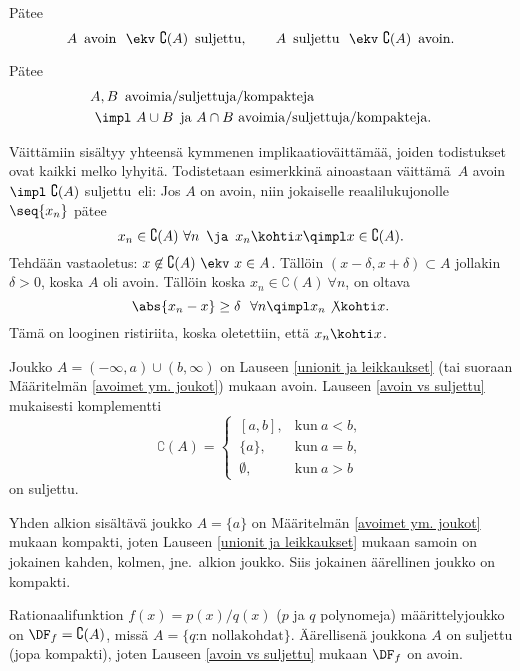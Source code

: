\begin{Lause} \label{avoin vs suljettu} Pätee
\[ 
A\,\text{ avoin }\ \ekv\ \complement(A)\,\text{ suljettu}, \qquad 
A\,\text{ suljettu }\ \ekv\ \complement(A)\,\text{ avoin}. 
\]
\end{Lause}
\begin{Lause} \label{unionit ja leikkaukset} Pätee
\begin{align*}
&A,B\,\text{ avoimia/suljettuja/kompakteja } \\
& \ \impl\ A\cup B\,\text{ ja } A\cap B\text{ avoimia/suljettuja/kompakteja}.
\end{align*}
\end{Lause}
\tod Väittämiin sisältyy yhteensä kymmenen implikaatioväittämää, joiden todistukset ovat
kaikki melko lyhyitä. Todistetaan esimerkkinä ainoastaan väittämä
$\,A$ avoin $\impl\ \complement (A)$ suljettu\, eli: Jos $A$ on avoin, niin jokaiselle
reaalilukujonolle $\seq{x_n}$ pätee
\[ 
x_n \in \complement(A)\ \forall n\,\ \ja\,\ x_n \kohti x \qimpl x \in \complement (A). 
\]
Tehdään vastaoletus: $x\not\in\complement (A)\ \ekv\ x \in A$. Tällöin 
$(x-\delta,x+\delta) \subset A$ jollakin $\delta>0$, koska $A$ oli avoin. Tällöin koska
$x_n\in\complement(A)\ \forall n$, on oltava
\[ 
\abs{x_n-x} \ge \delta\ \ \forall n \qimpl x_n \not\kohti x.
\]
Tämä on looginen ristiriita, koska oletettiin, että $x_n \kohti x$. \loppu
\begin{Exa} Joukko $A=(-\infty,a)\cup(b,\infty)$ on Lauseen \ref{unionit ja leikkaukset}
(tai suoraan Määritelmän \ref{avoimet ym. joukot}) mukaan avoin. Lauseen
\ref{avoin vs suljettu} mukaisesti komplementti
\[
\complement (A) = \begin{cases} 
                  \,[a,b], &\text{kun}\ a<b, \\ 
                  \,\{a\}, &\text{kun}\ a=b, \\
                  \,\emptyset, &\text{kun}\ a>b
                  \end{cases}
\]
on suljettu. \loppu
\end{Exa}
\begin{Exa} Yhden alkion sisältävä joukko $A=\{a\}$ on Määritelmän \ref{avoimet ym. joukot}
mukaan kompakti, joten Lauseen \ref{unionit ja leikkaukset} mukaan samoin on jokainen kahden,
kolmen, jne.\ alkion joukko. Siis jokainen äärellinen joukko on kompakti. \loppu
\end{Exa}
\begin{Exa} Rationaalifunktion $f(x)=p(x)/q(x)$ ($p$ ja $q$ polynomeja) määrittelyjoukko on
$\DF_f = \complement (A)$, missä $A = \{q\text{:n nollakohdat}\}$. Äärellisenä joukkona $A$
on suljettu (jopa kompakti), joten Lauseen \ref{avoin vs suljettu} mukaan $\DF_f$ on avoin.
\loppu \end{Exa} 

